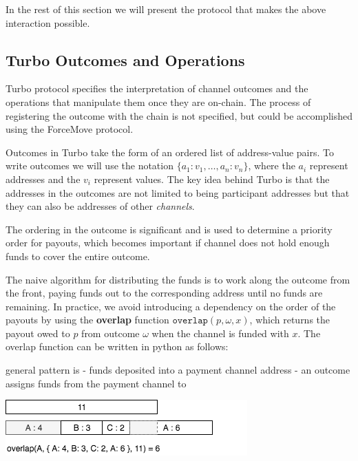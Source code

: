 \documentclass{article}
\theoremstyle{definition}
\begin{document}
In the rest of this section we will present the protocol that makes the above interaction
possible.

\subsection{Turbo Outcomes and Operations}

Turbo protocol specifies the interpretation of channel outcomes and the operations that
manipulate them once they are on-chain.
The process of registering the outcome with the chain is not specified, but could be accomplished
using the ForceMove protocol.

Outcomes in Turbo take the form of an ordered list of address-value pairs.
To write outcomes we will use the notation $\{a_1{:}v_1, \dots, a_n{:}v_n \}$, where the $a_i$
represent addresses and the $v_i$ represent values.
The key idea behind Turbo is that the addresses in the outcomes are not limited to being
participant addresses but that they can also be addresses of other \textit{channels}.

The ordering in the outcome is significant and is used to determine a priority order for payouts,
which becomes important if channel does not hold enough funds to cover the entire outcome.

The naive algorithm for distributing the funds is to work along the outcome from the front,
paying funds out to the corresponding address until no funds are remaining.
In practice, we avoid introducing a dependency on the order of the payouts by using
the \textbf{overlap} function $\texttt{overlap}(p, \omega, x)$, which returns the payout owed
to $p$ from outcome $\omega$ when the channel is funded with $x$.
The overlap function can be written in python as follows:

\begin{minipage}{\linewidth} %
  
\end{minipage}

general pattern is 
- funds deposited into a payment channel address
- an outcome assigns funds from the payment channel to 




\begin{center}
  \includegraphics[scale=0.7]{overlap} %
\end{center}
\end{document}
